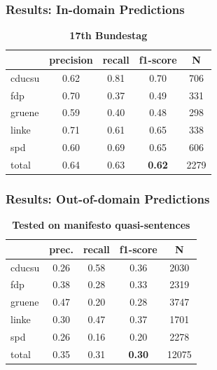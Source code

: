 \documentclass[]{beamer}
\begin{document}
\begin{frame}\frametitle{Results: In-domain Predictions}

\begin{table}[t]
\caption{
\label{tab:results_in-domain}
{\bf 17th Bundestag}}
\begin{center}
\begin{tabular}{lcccc}
    &         precision    &recall &  f1-score  & N  \\
\hline \hline
       cducsu   &    0.62  &    0.81  &    0.70  &     706\\
        fdp    &   0.70   &   0.37  &    0.49    &   331\\
     gruene &      0.59  &    0.40   &   0.48   &    298\\
      linke    &   0.71   &   0.61  &    0.65    &   338\\
        spd   &    0.60   &   0.69  &    0.65   &    606\\
\hline
 total &      0.64   &   0.63   &   {\bf 0.62}    &  2279 
%
\end{tabular}
\end{center}
\end{table}

\end{frame}


\begin{frame}\frametitle{Results: Out-of-domain Predictions}

\begin{table}[t]
\caption{
\label{tab:results_out-of-domain}
{\bf Tested on manifesto quasi-sentences}}
\begin{center}
\begin{tabular}{lcccc}
    &         prec.    &recall &  f1-score  & N  \\
\hline \hline
    cducsu    &   0.26   &   0.58   &   0.36    &   2030 \\
    fdp    &   0.38   &   0.28   &   0.33    &   2319 \\
     gruene   &    0.47    &  0.20   &   0.28    &  3747\\
      linke     &  0.30  &    0.47    &  0.37    &   1701\\
        spd     &  0.26  &    0.16   &   0.20    &   2278\\
\hline
total    &   0.35  &    0.31  &    {\bf 0.30}   &   12075\\
%
\end{tabular}
\end{center}

\end{table}

\end{frame}
\end{document}
